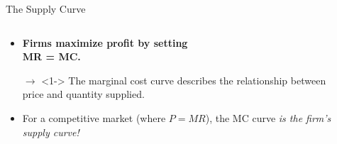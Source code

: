 \documentclass[9pt]{beamer}
\begin{document}
\begin{frame}{The Supply Curve}
    \begin{columns}[c]
    \begin{column}{0.5\textwidth}
        \begin{itemize}
            \item<1-> \textbf{Firms maximize profit by setting\\
            MR = MC.}
            \item[$\rightarrow$]<1->  The marginal cost curve describes the relationship between price and quantity supplied.
            \vspace{10pt}
            \item<2-> For a competitive market (where $P = MR$), the MC curve \textit{is the firm's supply curve!}
        \end{itemize}
    \end{column}
    \begin{column}{0.5\textwidth}

\end{column}
\end{columns}
\end{frame}
\end{document}
